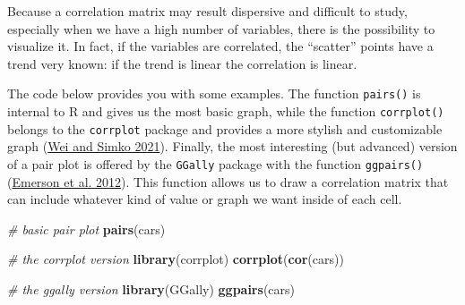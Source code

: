 \documentclass[
]{svmono}
\newenvironment{Shaded}{\begin{snugshade}}{\end{snugshade}}
\newcommand{\AttributeTok}[1]{\textcolor[rgb]{0.13,0.29,0.53}{#1}}
\newcommand{\CommentTok}[1]{\textcolor[rgb]{0.56,0.35,0.01}{\textit{#1}}}
\newcommand{\DecValTok}[1]{\textcolor[rgb]{0.00,0.00,0.81}{#1}}
\newcommand{\FunctionTok}[1]{\textcolor[rgb]{0.13,0.29,0.53}{\textbf{#1}}}
\newcommand{\NormalTok}[1]{#1}
\newcommand{\SpecialCharTok}[1]{\textcolor[rgb]{0.81,0.36,0.00}{\textbf{#1}}}
\newcommand{\StringTok}[1]{\textcolor[rgb]{0.31,0.60,0.02}{#1}}
\begin{document}
\begin{Shaded}
\end{Shaded}

Because a correlation matrix may result dispersive and difficult to
study, especially when we have a high number of variables, there is the
possibility to visualize it. In fact, if the variables are correlated,
the ``scatter'' points have a trend very known: if the trend is linear the
correlation is linear.

The code below provides you with some examples. The function \texttt{pairs()}
is internal to R and gives us the most basic graph, while the function
\texttt{corrplot()} belongs to the \texttt{corrplot} package and provides a more
stylish and customizable graph (\protect\hyperlink{ref-wei2021}{Wei and Simko 2021}). Finally, the most interesting
(but advanced) version of a pair plot is offered by the \texttt{GGally} package
with the function \texttt{ggpairs()}(\protect\hyperlink{ref-emerson2012}{Emerson et al. 2012}). This function allows us to
draw a correlation matrix that can include whatever kind of value or
graph we want inside of each cell.

\begin{Shaded}
\begin{Highlighting}[]
\CommentTok{\# basic pair plot}
\FunctionTok{pairs}\NormalTok{(cars)}

\CommentTok{\# the corrplot version}
\FunctionTok{library}\NormalTok{(corrplot)}
\FunctionTok{corrplot}\NormalTok{(}\FunctionTok{cor}\NormalTok{(cars))}

\CommentTok{\# the ggally version}
\FunctionTok{library}\NormalTok{(GGally)}
\FunctionTok{ggpairs}\NormalTok{(cars)}
\end{Highlighting}
\end{Shaded}
\end{document}
